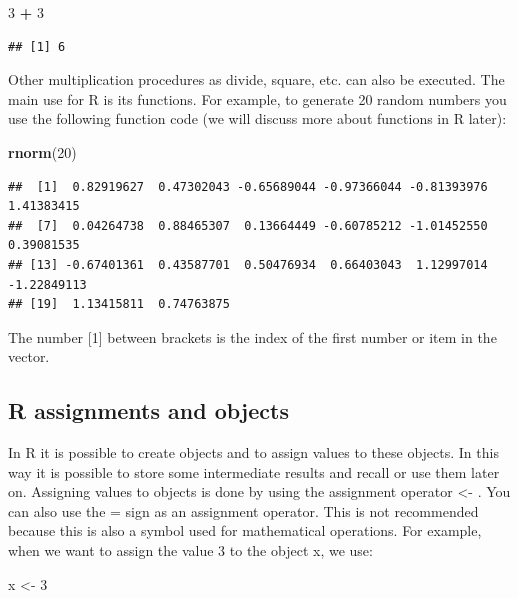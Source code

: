 \documentclass[
]{book}
\newenvironment{Shaded}{\begin{snugshade}}{\end{snugshade}}
\newcommand{\DecValTok}[1]{\textcolor[rgb]{0.00,0.00,0.81}{#1}}
\newcommand{\KeywordTok}[1]{\textcolor[rgb]{0.13,0.29,0.53}{\textbf{#1}}}
\newcommand{\NormalTok}[1]{#1}
\newcommand{\OperatorTok}[1]{\textcolor[rgb]{0.81,0.36,0.00}{\textbf{#1}}}
\newcommand{\StringTok}[1]{\textcolor[rgb]{0.31,0.60,0.02}{#1}}
\begin{document}
\begin{Shaded}
\begin{Highlighting}[]
\DecValTok{3} \OperatorTok{+}\StringTok{ }\DecValTok{3}
\end{Highlighting}
\end{Shaded}

\begin{verbatim}
## [1] 6
\end{verbatim}

Other multiplication procedures as divide, square, etc. can also be executed. The main use for R is its functions. For example, to generate 20 random numbers you use the following function code (we will discuss more about functions in R later):

\begin{Shaded}
\begin{Highlighting}[]
\KeywordTok{rnorm}\NormalTok{(}\DecValTok{20}\NormalTok{)}
\end{Highlighting}
\end{Shaded}

\begin{verbatim}
##  [1]  0.82919627  0.47302043 -0.65689044 -0.97366044 -0.81393976  1.41383415
##  [7]  0.04264738  0.88465307  0.13664449 -0.60785212 -1.01452550  0.39081535
## [13] -0.67401361  0.43587701  0.50476934  0.66403043  1.12997014 -1.22849113
## [19]  1.13415811  0.74763875
\end{verbatim}

The number {[}1{]} between brackets is the index of the first number or item in the vector.

\hypertarget{r-assignments-and-objects}{%
\subsection{R assignments and objects}\label{r-assignments-and-objects}}

In R it is possible to create objects and to assign values to these objects. In this way it is possible to store some intermediate results and recall or use them later on. Assigning values to objects is done by using the assignment operator \textless- . You can also use the = sign as an assignment operator. This is not recommended because this is also a symbol used for mathematical operations. For example, when we want to assign the value 3 to the object x, we use:

\begin{Shaded}
\begin{Highlighting}[]
\NormalTok{x <-}\StringTok{ }\DecValTok{3} 
\end{Highlighting}
\end{Shaded}
\end{document}
